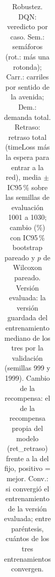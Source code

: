 \begin{table}[H]
\begin{tabular}{llcrrrrrrcl}
\bottomrule
\end{tabular}
\caption[Robustez: veredicto de DQN]{Robustez. DQN: veredicto por caso. Sem.: semáforos (rot.: más una rotonda); Carr.: carriles por sentido de la avenida; Dem.: demanda total. Retraso: retraso total (timeLoss más la espera para entrar a la red), media $\pm$ IC95\,\% sobre las semillas de evaluación 1001 a 1030; cambio (\%) con IC95\,\% bootstrap pareado y $p$ de Wilcoxon pareado. Versión evaluada: la versión guardada del entrenamiento mediano de los tres por la validación (semillas 999 y 1999). Cambio de la recompensa: el de la recompensa propia del modelo (ret\_retraso) frente a la del fijo, positivo = mejor. Conv.: si convergió el entrenamiento de la versión evaluada; entre paréntesis, cuántos de los tres entrenamientos convergen.}
\label{tab:robustez-veredicto-dqn}
\end{table}
